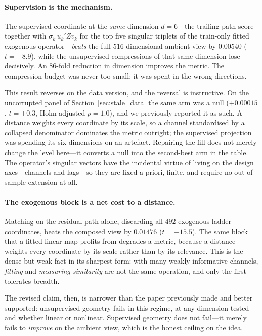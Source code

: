 \paragraph{Supervision is the mechanism.} The supervised coordinate at the
\emph{same} dimension $d = 6$---the trailing-path score together with
$\sigma_k\, u_k' Z v_k$ for the top five singular triplets of the train-only
fitted exogenous operator---\emph{beats} the full $516$-dimensional ambient
view by $0.00540$ ($t = -8.9$), while the unsupervised compressions of that
same dimension lose decisively. An $86$-fold reduction in dimension improves
the metric. The compression budget was never too small; it was spent in the
wrong directions.

This result reverses on the data version, and the reversal is instructive. On
the uncorrupted panel of Section~\ref{sec:stale_data} the same arm was a null
($+0.00015$, $t = +0.3$, Holm-adjusted $p = 1.0$), and we previously reported
it as such. A distance weights every coordinate by its scale, so a channel
standardised by a collapsed denominator dominates the metric outright; the
supervised projection was spending its six dimensions on an artefact. Repairing
the fill does not merely change the level here---it converts a null into the
second-best arm in the table. The operator's singular vectors have the incidental virtue of
living on the design axes---channels and lags---so they are fixed a priori,
finite, and require no out-of-sample extension at all.

\paragraph{The exogenous block is a net cost to a distance.} Matching on the
residual path alone, discarding all $492$ exogenous ladder coordinates, beats
the composed view by $0.01476$ ($t = -15.5$). The same block that a fitted
linear map profits from degrades a metric, because a distance weights every
coordinate by its scale rather than by its relevance. This is the
dense-but-weak fact in its sharpest form: with many weakly informative
channels, \emph{fitting} and \emph{measuring similarity} are not the same
operation, and only the first tolerates breadth.

The revised claim, then, is narrower than the paper previously made and
better supported: unsupervised geometry fails in this regime, at any
dimension tested and whether linear or nonlinear. Supervised geometry does
not fail---it merely fails to \emph{improve} on the ambient view, which is
the honest ceiling on the idea.

